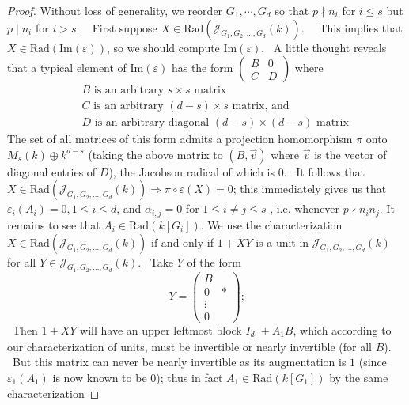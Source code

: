\documentclass[12pt, a4paper]{amsart}
\numberwithin{equation}{section} %
\theoremstyle{plain}
\theoremstyle{definition}
\theoremstyle{plain}
\theoremstyle{remark}
\begin{document}
\begin{proof}
Without loss of generality, we reorder $G_{1},\cdots ,G_{d}$ so that $p\nmid
n_{i}$ for $i\leq s$ but $p\mid n_{i}$ for $i>s$. \ \newline
First suppose $X\in \text{Rad}(\mathcal{J}_{G_1, G_2, \ldots, G_d}(k))$. \ \ This
implies that $X\in \text{Rad}(\text{Im}(\varepsilon ))$, so we should compute $%
\text{Im}(\varepsilon )$. \ A little thought reveals that a typical element
of $\text{Im}(\varepsilon )$ has the form $\left( 
\begin{array}{ll}
B & 0 \\ 
C & D%
\end{array}%
\right) $ where%
\begin{eqnarray*}
&&B\text{ is an arbitrary }s\times s\text{ matrix} \\
&&C\text{ is an arbitrary }(d-s)\times s\text{ matrix, and} \\
&&D\text{ is an arbitrary diagonal }(d-s)\times (d-s)\text{ matrix}
\end{eqnarray*}%
The set of all matrices of this form admits a projection homomorphism $\pi $
onto $M_{s}(k)\oplus k^{d-s}$ (taking the above matrix to $(B,%
\overrightarrow{v})$ where $\overrightarrow{v}$ is the vector of diagonal
entries of $D$), the Jacobson radical of which is $0$. \ It follows that $%
X\in \text{Rad}(\mathcal{J}_{G_1, G_2, \ldots, G_d}(k))\Longrightarrow \pi \circ
\varepsilon (X)=0$; this immediately gives us that $\varepsilon
_{i}(A_{i})=0,1\leq i\leq d$, and $\alpha _{i,j}=0$ for $1\leq i\neq j\leq s$%
, i.e. whenever $p\nmid n_{i}n_{j}.$ It remains to see that $A_{i}\in
\text{Rad}(k[G_{i}])$.\newline
We use the characterization $X\in \text{Rad}(\mathcal{J}_{G_1, G_2, \ldots,
G_d}(k))$ if and only if $1+XY$ is a unit in $\mathcal{J}_{G_1, G_2,
\ldots, G_d}(k)$ for all $Y\in \mathcal{J}_{G_1, G_2, \ldots, G_d}(k)$. \
Take $Y$ of the form 
\[
Y=\left( 
\begin{array}{ll}
B &  \\ 
0 & \ast  \\ 
\vdots  &  \\ 
0 & 
\end{array}%
\right) \text{;}
\]%
\ Then $1+XY$ will have an upper leftmost block $I_{d_{1}}+A_{1}B$, which
according to our characterization of units, must be invertible or nearly
invertible (for all $B$). \ But this matrix can never be nearly invertible
as its augmentation is $1$ (since $\varepsilon _{1}(A_{1})$ is now known to
be $0$); thus in fact $A_{1}\in \text{Rad}(k[G_{1}])$ by the same characterization

\end{proof}
\end{document}
